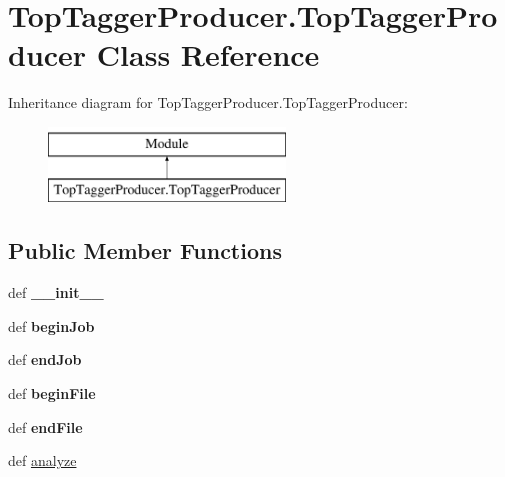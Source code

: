 \hypertarget{classTopTaggerProducer_1_1TopTaggerProducer}{\section{Top\-Tagger\-Producer.\-Top\-Tagger\-Producer Class Reference}
\label{classTopTaggerProducer_1_1TopTaggerProducer}
}
Inheritance diagram for Top\-Tagger\-Producer.\-Top\-Tagger\-Producer\-:\begin{figure}[H]
\begin{center}
\leavevmode
\includegraphics[height=2.000000cm]{classTopTaggerProducer_1_1TopTaggerProducer}
\end{center}
\end{figure}
\subsection*{Public Member Functions}
\begin{DoxyCompactItemize}
\item 
\hypertarget{classTopTaggerProducer_1_1TopTaggerProducer_a5c8f092651954386327e012eba734d20}{def {\bfseries \-\_\-\-\_\-init\-\_\-\-\_\-}}\label{classTopTaggerProducer_1_1TopTaggerProducer_a5c8f092651954386327e012eba734d20}

\item 
\hypertarget{classTopTaggerProducer_1_1TopTaggerProducer_a1d546bc8b364f136ac702cf1c784bb4f}{def {\bfseries begin\-Job}}\label{classTopTaggerProducer_1_1TopTaggerProducer_a1d546bc8b364f136ac702cf1c784bb4f}

\item 
\hypertarget{classTopTaggerProducer_1_1TopTaggerProducer_a79fe99bc2c04b09cc1a5ef9ed4aa7cc2}{def {\bfseries end\-Job}}\label{classTopTaggerProducer_1_1TopTaggerProducer_a79fe99bc2c04b09cc1a5ef9ed4aa7cc2}

\item 
\hypertarget{classTopTaggerProducer_1_1TopTaggerProducer_ab9a0f96420760a8ccd8ec514b9fbe0db}{def {\bfseries begin\-File}}\label{classTopTaggerProducer_1_1TopTaggerProducer_ab9a0f96420760a8ccd8ec514b9fbe0db}

\item 
\hypertarget{classTopTaggerProducer_1_1TopTaggerProducer_a039e05fd9e1ba5b350f58d92d4bdb77d}{def {\bfseries end\-File}}\label{classTopTaggerProducer_1_1TopTaggerProducer_a039e05fd9e1ba5b350f58d92d4bdb77d}

\item 
def \hyperlink{classTopTaggerProducer_1_1TopTaggerProducer_a61f541cf9fa6fe2c85bef6f35d388b53}{analyze}
\end{DoxyCompactItemize}
